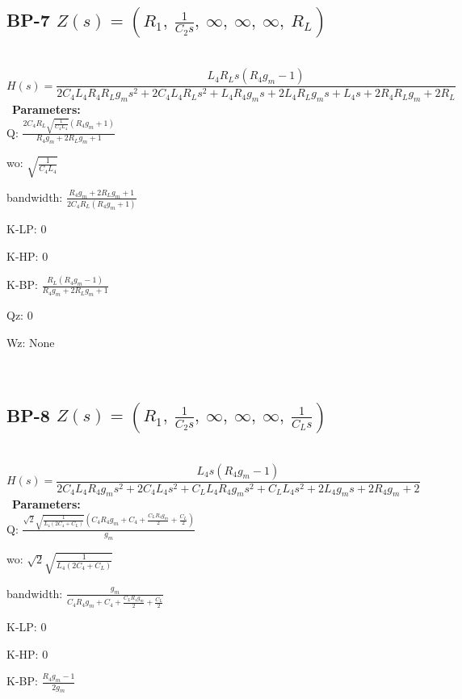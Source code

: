 \documentclass{article}
\begin{document}
\subsection{BP-7 $Z(s) = \left( R_{1}, \  \frac{1}{C_{2} s}, \  \infty, \  \infty, \  \infty, \  R_{L}\right)$ } \ 
\textbf{\[H(s) = \frac{L_{4} R_{L} s \left(R_{4} g_{m} - 1\right)}{2 C_{4} L_{4} R_{4} R_{L} g_{m} s^{2} + 2 C_{4} L_{4} R_{L} s^{2} + L_{4} R_{4} g_{m} s + 2 L_{4} R_{L} g_{m} s + L_{4} s + 2 R_{4} R_{L} g_{m} + 2 R_{L}}\] } \ 
\textbf{Parameters:}\\ 

Q: $\frac{2 C_{4} R_{L} \sqrt{\frac{1}{C_{4} L_{4}}} \left(R_{4} g_{m} + 1\right)}{R_{4} g_{m} + 2 R_{L} g_{m} + 1}$\ 

wo: $\sqrt{\frac{1}{C_{4} L_{4}}}$\ 

bandwidth: $\frac{R_{4} g_{m} + 2 R_{L} g_{m} + 1}{2 C_{4} R_{L} \left(R_{4} g_{m} + 1\right)}$\ 

K-LP: $0$\ 

K-HP: $0$\ 

K-BP: $\frac{R_{L} \left(R_{4} g_{m} - 1\right)}{R_{4} g_{m} + 2 R_{L} g_{m} + 1}$\ 

Qz: $0$\ 

Wz: $\text{None}$\ 

\ 

\subsection{BP-8 $Z(s) = \left( R_{1}, \  \frac{1}{C_{2} s}, \  \infty, \  \infty, \  \infty, \  \frac{1}{C_{L} s}\right)$ } \ 
\textbf{\[H(s) = \frac{L_{4} s \left(R_{4} g_{m} - 1\right)}{2 C_{4} L_{4} R_{4} g_{m} s^{2} + 2 C_{4} L_{4} s^{2} + C_{L} L_{4} R_{4} g_{m} s^{2} + C_{L} L_{4} s^{2} + 2 L_{4} g_{m} s + 2 R_{4} g_{m} + 2}\] } \ 
\textbf{Parameters:}\\ 

Q: $\frac{\sqrt{2} \sqrt{\frac{1}{L_{4} \left(2 C_{4} + C_{L}\right)}} \left(C_{4} R_{4} g_{m} + C_{4} + \frac{C_{L} R_{4} g_{m}}{2} + \frac{C_{L}}{2}\right)}{g_{m}}$\ 

wo: $\sqrt{2} \sqrt{\frac{1}{L_{4} \left(2 C_{4} + C_{L}\right)}}$\ 

bandwidth: $\frac{g_{m}}{C_{4} R_{4} g_{m} + C_{4} + \frac{C_{L} R_{4} g_{m}}{2} + \frac{C_{L}}{2}}$\ 

K-LP: $0$\ 

K-HP: $0$\ 

K-BP: $\frac{R_{4} g_{m} - 1}{2 g_{m}}$\ 
\end{document}
